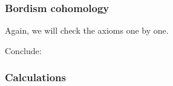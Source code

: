 \documentclass[a4paper,11pt]{article}
\begin{document}
\subsubsection{Bordism cohomology}
Again, we will check the axioms one by one.

\begin{lemma}[Functoriality]
\end{lemma}

\begin{lemma}[Naturality]
\end{lemma}

\begin{lemma}
\end{lemma}

\begin{lemma}
\end{lemma}

\begin{lemma}[Excision]
\end{lemma}

\begin{lemma}
\end{lemma}

\begin{observation}
\end{observation}

Conclude:
\begin{theorem}
\end{theorem}

\subsubsection{Calculations}



\newpage\printbibliography%
\end{document}

